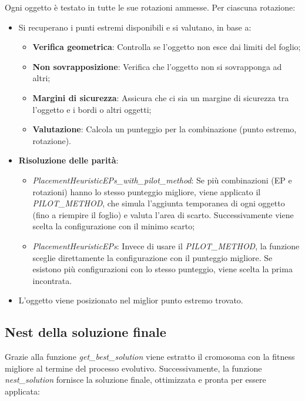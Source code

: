 Ogni oggetto è testato in tutte le sue rotazioni ammesse. Per ciascuna rotazione:
\begin{itemize}
    \item Si recuperano i punti estremi disponibili e si valutano, in base a:
    \begin{itemize}
        \item \textbf{Verifica geometrica}: Controlla se l'oggetto non esce dai limiti del foglio;
        \item \textbf{Non sovrapposizione}: Verifica che l'oggetto non si sovrapponga ad altri;
        \item \textbf{Margini di sicurezza}: Assicura che ci sia un margine di sicurezza tra l'oggetto e i bordi o altri oggetti;
        \item \textbf{Valutazione}: Calcola un punteggio per la combinazione (punto estremo, rotazione).
    \end{itemize}
    \item \textbf{Risoluzione delle parità}:
    \begin{itemize}
        \item \emph{PlacementHeuristicEPs\_with\_pilot\_method}: Se più combinazioni (EP e rotazioni) hanno lo stesso punteggio migliore, viene applicato il \emph{PILOT\_METHOD}, che simula l'aggiunta temporanea di ogni oggetto (fino a riempire il foglio) e valuta l'area di scarto. Successivamente viene scelta la configurazione con il minimo scarto;
        \item \emph{PlacementHeuristicEPs}: Invece di usare il \emph{PILOT\_METHOD}, la funzione sceglie direttamente la configurazione con il punteggio migliore. Se esistono più configurazioni con lo stesso punteggio, viene scelta la prima incontrata.
    \end{itemize}
    \item L'oggetto viene posizionato nel miglior punto estremo trovato.
\end{itemize}

\subsection{Nest della soluzione finale}

Grazie alla funzione \emph{get\_best\_solution} viene estratto il cromosoma con la fitness migliore al termine del processo evolutivo. Successivamente, la funzione \emph{nest\_solution} fornisce la soluzione finale, ottimizzata e pronta per essere applicata:

